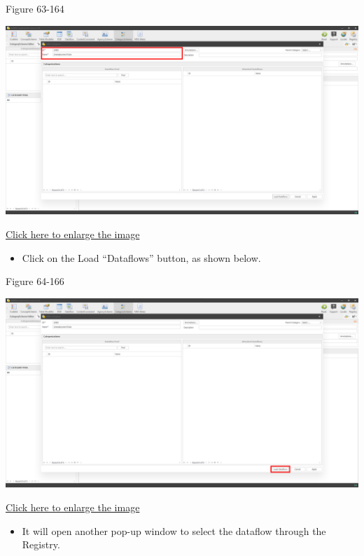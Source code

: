 \documentclass[
]{book}
\providecommand{\tightlist}{%
  \setlength{\itemsep}{0pt}\setlength{\parskip}{0pt}}
\theoremstyle{definition}
\theoremstyle{definition}
\theoremstyle{definition}
\theoremstyle{definition}
\theoremstyle{remark}
\begin{document}
Figure 63-164

\begin{center}\includegraphics[width=1\linewidth]{./images/image164} \end{center}

\href{images/image164.png}{Click here to enlarge the image}

\begin{itemize}
\tightlist
\item
  Click on the Load ``Dataflows'' button, as shown below.
\end{itemize}

Figure 64-166

\begin{center}\includegraphics[width=1\linewidth]{./images/image166} \end{center}

\href{images/image166.png}{Click here to enlarge the image}

\begin{itemize}
\tightlist
\item
  It will open another pop-up window to select the dataflow through the Registry.
\end{itemize}
\end{document}
